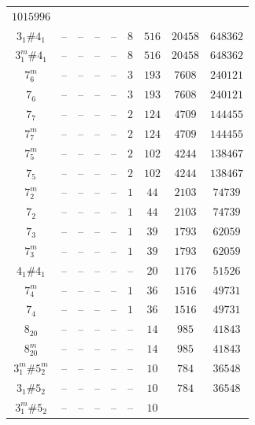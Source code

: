 \documentclass[amsmath,secnumarabic,floatfix,amssymb,nofootinbib,nobibnotes,letterpaper,11pt,tightenlines,showkeys]{revtex4}
\theoremstyle{definition}
\begin{document}
\begin{table}[tp]
\begin{ruledtabular}
\begin{tabular}{ccccccccc}
$\num{1015996}$\\
$3_{1}^{}\#4_{1}^{}$ &
-- &
-- &
-- &
-- &
$\num{8}$ &
$\num{516}$ &
$\num{20458}$ &
$\num{648362}$\\
$3_{1}^{m}\#4_{1}^{}$ &
-- &
-- &
-- &
-- &
$\num{8}$ &
$\num{516}$ &
$\num{20458}$ &
$\num{648362}$\\
$7_{6}^{m}$ &
-- &
-- &
-- &
-- &
$\num{3}$ &
$\num{193}$ &
$\num{7608}$ &
$\num{240121}$\\
$7_{6}^{}$ &
-- &
-- &
-- &
-- &
$\num{3}$ &
$\num{193}$ &
$\num{7608}$ &
$\num{240121}$\\
$7_{7}^{}$ &
-- &
-- &
-- &
-- &
$\num{2}$ &
$\num{124}$ &
$\num{4709}$ &
$\num{144455}$\\
$7_{7}^{m}$ &
-- &
-- &
-- &
-- &
$\num{2}$ &
$\num{124}$ &
$\num{4709}$ &
$\num{144455}$\\
$7_{5}^{m}$ &
-- &
-- &
-- &
-- &
$\num{2}$ &
$\num{102}$ &
$\num{4244}$ &
$\num{138467}$\\
$7_{5}^{}$ &
-- &
-- &
-- &
-- &
$\num{2}$ &
$\num{102}$ &
$\num{4244}$ &
$\num{138467}$\\
$7_{2}^{m}$ &
-- &
-- &
-- &
-- &
$\num{1}$ &
$\num{44}$ &
$\num{2103}$ &
$\num{74739}$\\
$7_{2}^{}$ &
-- &
-- &
-- &
-- &
$\num{1}$ &
$\num{44}$ &
$\num{2103}$ &
$\num{74739}$\\
$7_{3}^{}$ &
-- &
-- &
-- &
-- &
$\num{1}$ &
$\num{39}$ &
$\num{1793}$ &
$\num{62059}$\\
$7_{3}^{m}$ &
-- &
-- &
-- &
-- &
$\num{1}$ &
$\num{39}$ &
$\num{1793}$ &
$\num{62059}$\\
$4_{1}^{}\#4_{1}^{}$ &
-- &
-- &
-- &
-- &
-- &
$\num{20}$ &
$\num{1176}$ &
$\num{51526}$\\
$7_{4}^{m}$ &
-- &
-- &
-- &
-- &
$\num{1}$ &
$\num{36}$ &
$\num{1516}$ &
$\num{49731}$\\
$7_{4}^{}$ &
-- &
-- &
-- &
-- &
$\num{1}$ &
$\num{36}$ &
$\num{1516}$ &
$\num{49731}$\\
$8_{20}^{}$ &
-- &
-- &
-- &
-- &
-- &
$\num{14}$ &
$\num{985}$ &
$\num{41843}$\\
$8_{20}^{m}$ &
-- &
-- &
-- &
-- &
-- &
$\num{14}$ &
$\num{985}$ &
$\num{41843}$\\
$3_{1}^{m}\#5_{2}^{m}$ &
-- &
-- &
-- &
-- &
-- &
$\num{10}$ &
$\num{784}$ &
$\num{36548}$\\
$3_{1}^{}\#5_{2}^{}$ &
-- &
-- &
-- &
-- &
-- &
$\num{10}$ &
$\num{784}$ &
$\num{36548}$\\
$3_{1}^{m}\#5_{2}^{}$ &
-- &
-- &
-- &
-- &
-- &
$\num{10}$ &

\end{tabular}
\end{ruledtabular}
\end{table}
\end{document}
